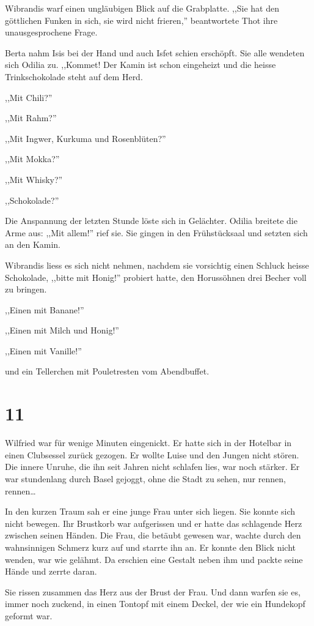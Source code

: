 Wibrandis warf einen ungläubigen Blick auf die Grabplatte. ,,Sie hat den göttlichen Funken in sich, sie wird nicht frieren,'' beantwortete Thot ihre unausgesprochene Frage.

Berta nahm Isis bei der Hand und auch Isfet schien erschöpft. Sie alle wendeten sich Odilia zu. ,,Kommet! Der Kamin ist schon eingeheizt und die heisse Trinkschokolade steht auf dem Herd.

,,Mit Chili?''

,,Mit Rahm?''

,,Mit Ingwer, Kurkuma und Rosenblüten?''

,,Mit Mokka?''

,,Mit Whisky?''

,,Schokolade?''

Die Anspannung der letzten Stunde löste sich in Gelächter. Odilia breitete die Arme aus: ,,Mit allem!'' rief sie. Sie gingen in den Frühstücksaal und setzten sich an den Kamin.

Wibrandis liess es sich nicht nehmen, nachdem sie vorsichtig einen Schluck heisse Schokolade, ,,bitte mit Honig!'' probiert hatte, den Horussöhnen drei Becher voll zu bringen.

,,Einen mit Banane!''

,,Einen mit Milch und Honig!''

,,Einen mit Vanille!''

und ein Tellerchen mit Pouletresten vom Abendbuffet.

\section*{11}

Wilfried war für wenige Minuten eingenickt. Er hatte sich in der Hotelbar in einen Clubsessel zurück gezogen. Er wollte Luise und den Jungen nicht stören. Die innere Unruhe, die ihn seit Jahren nicht schlafen lies, war noch stärker. Er war stundenlang durch Basel gejoggt, ohne die Stadt zu sehen, nur rennen, rennen\dots

In den kurzen Traum sah er eine junge Frau unter sich liegen. Sie konnte sich nicht bewegen. Ihr Brustkorb war aufgerissen und er hatte das schlagende Herz zwischen seinen Händen. Die Frau, die betäubt gewesen war, wachte durch den wahnsinnigen Schmerz kurz auf und starrte ihn an. Er konnte den Blick nicht wenden, war wie gelähmt. Da erschien eine Gestalt neben ihm und packte seine Hände und zerrte daran. 

Sie rissen zusammen das Herz aus der Brust der Frau. Und dann warfen sie es, immer noch zuckend, in einen Tontopf mit einem Deckel, der wie ein Hundekopf geformt war.

